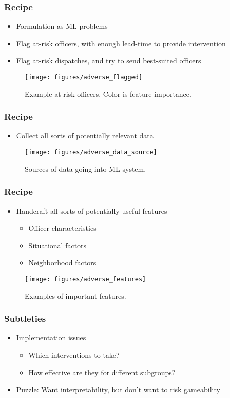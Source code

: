 \documentclass[10pt,mathserif]{beamer}
\begin{document}
\begin{frame}
  \frametitle{Recipe}
  \begin{itemize}
  \item Formulation as ML problems
  \item Flag at-risk officers, with enough lead-time to provide intervention
  \item Flag at-risk dispatches, and try to send best-suited officers
  \end{itemize}
  \begin{figure}[ht]
    \centering
    \texttt{[image: figures/adverse\_flagged]}
    \caption{\label{fig:label} Example at risk officers. Color is feature importance. }
  \end{figure}
\end{frame}

\begin{frame}
  \frametitle{Recipe}
  \begin{itemize}
  \item Collect all sorts of potentially relevant data
  \end{itemize}
  \begin{figure}
    \centering
    \texttt{[image: figures/adverse\_data\_source]}
    \caption{Sources of data going into ML system. \label{fig:label} }
\end{figure}
\end{frame}

\begin{frame}
  \frametitle{Recipe}
  \begin{itemize}
  \item Handcraft all sorts of potentially useful features
    \begin{itemize}
    \item Officer characteristics
    \item Situational factors
    \item Neighborhood factors
    \end{itemize}
  \end{itemize}
  \begin{figure}[ht]
    \centering
    \texttt{[image: figures/adverse\_features]}
    \caption{Examples of important features. \label{fig:label} }
  \end{figure}
\end{frame}

\begin{frame}
  \frametitle{Subtleties}
  \begin{itemize}
  \item Implementation issues
    \begin{itemize}
    \item Which interventions to take?
    \item How effective are they for different subgroups?
    \end{itemize}
  \item Puzzle: Want interpretability, but don't want to risk gameability
  \end{itemize}
\end{frame}
\end{document}
